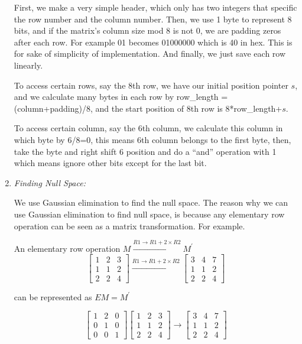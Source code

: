 \documentclass[12pt]{article} %
\newcommand{\itemgap}[1][2]{\vspace{#1mm}}
\begin{document}
\begin{enumerate}
		First, we make a very simple header, which only has two integers that specific the row number and the column number. Then, we use 1 byte to represent 8 bits, and if the matrix's column size mod 8 is not 0, we are padding zeros after each row. For example 01 becomes 01000000 which is 40 in hex. This is for sake of simplicity of implementation. And finally, we just save each row linearly.
		
		To access certain rows, say the 8th row, we have our initial position pointer $s$, and we calculate many bytes in each row by row\_length = (column+padding)/8, and the start position of 8th row is 8*row\_length+$s$. 
		
		To access certain column, say the 6th column, we calculate this column in which byte by 6/8=0, this means 6th column belongs to the first byte, then, take the byte and right shift 6 position and do a ``and'' operation with 1 which means ignore other bits except for the last bit.
		
		\item \textit{Finding Null Space:} \itemgap
		
		We use Gaussian elimination to find the null space. The reason why we can use Gaussian elimination to find null space, is because any elementary row operation can be seen as a matrix transformation. For example.
		
		An elementary row operation $M\xrightarrow{R1\rightarrow R1+2\times R2}M^\prime$
		$$
		\begin{bmatrix}
		1 & 2 & 3 \\
		1 & 1 & 2 \\
		2 & 2 & 4
		\end{bmatrix}\xrightarrow{R1\rightarrow R1+2\times R2}
		\begin{bmatrix}
		3 & 4 & 7 \\
		1 & 1 & 2 \\
		2 & 2 & 4
		\end{bmatrix}
		$$
		
		can be represented as $EM=M^\prime$
		
		$$
		\begin{bmatrix}
		1 & 2 & 0 \\
		0 & 1 & 0 \\
		0 & 0 & 1
		\end{bmatrix}
		\begin{bmatrix}
		1 & 2 & 3 \\
		1 & 1 & 2 \\
		2 & 2 & 4
		\end{bmatrix} \rightarrow
		\begin{bmatrix}
		3 & 4 & 7 \\
		1 & 1 & 2 \\
		2 & 2 & 4
		\end{bmatrix}
		$$
		

\end{enumerate}
\end{document}
